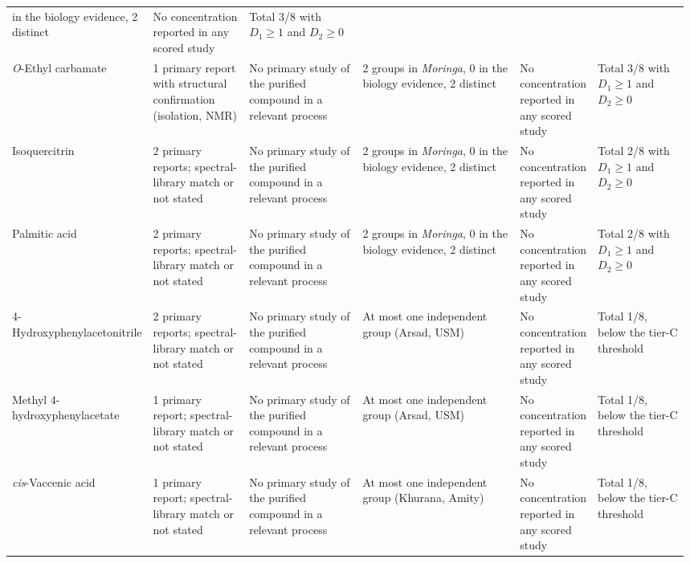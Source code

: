 \begin{landscape}
\begin{longtable}{@{}L{0.11\linewidth} L{0.15\linewidth} L{0.19\linewidth}
    L{0.27\linewidth} L{0.11\linewidth} L{0.15\linewidth}@{}}
      in the biology evidence, 2 distinct & No concentration reported in any scored study
    & Total 3/8 with $D_1\ge1$ and $D_2\ge0$ \\
  \textit{O}-Ethyl carbamate & 1 primary report with structural confirmation (isolation, NMR)
    & No primary study of the purified compound in a relevant process & 2 groups in
      \textit{Moringa}, 0 in the biology evidence, 2 distinct & No concentration reported in
      any scored study & Total 3/8 with $D_1\ge1$ and $D_2\ge0$ \\
  Isoquercitrin & 2 primary reports; spectral-library match or not stated & No primary study
      of the purified compound in a relevant process & 2 groups in \textit{Moringa}, 0 in the
      biology evidence, 2 distinct & No concentration reported in any scored study & Total
      2/8 with $D_1\ge1$ and $D_2\ge0$ \\
  Palmitic acid & 2 primary reports; spectral-library match or not stated & No primary study
      of the purified compound in a relevant process & 2 groups in \textit{Moringa}, 0 in the
      biology evidence, 2 distinct & No concentration reported in any scored study & Total
      2/8 with $D_1\ge1$ and $D_2\ge0$ \\
  4-Hydroxyphenyl\-acetonitrile & 2 primary reports; spectral-library match or not stated
    & No primary study of the purified compound in a relevant process & At most one
      independent group (Arsad, USM) & No concentration reported in any scored study
    & Total 1/8, below the tier-C threshold \\
  Methyl 4-hydroxyphenyl\-acetate & 1 primary report; spectral-library match or not stated
    & No primary study of the purified compound in a relevant process & At most one
      independent group (Arsad, USM) & No concentration reported in any scored study
    & Total 1/8, below the tier-C threshold \\
  \textit{cis}-Vaccenic acid & 1 primary report; spectral-library match or not stated & No
      primary study of the purified compound in a relevant process & At most one independent
      group (Khurana, Amity) & No concentration reported in any scored study & Total 1/8,
      below the tier-C threshold \\
\end{longtable}
\endgroup
\end{landscape}

